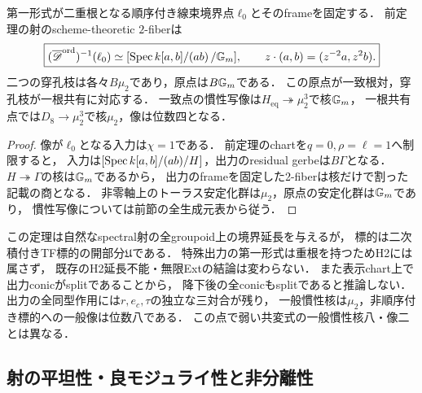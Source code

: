 \begin{corollary}[線束境界上の全fiber]
\label{cor:qa-global-fricke-boundary-fiber}
第一形式が二重根となる順序付き線束境界点$\ell_0$とそのframeを固定する．
前定理の射のscheme-theoretic $2$-fiberは
\[
 \boxed{
 (\overline{\mathscr D}^{\mathrm{ord}})^{-1}(\ell_0)
 \simeq[\operatorname{Spec} k[a,b]/(ab)\,/\mathbb G_m],
 \qquad z\cdot(a,b)=(z^{-2}a,z^2b).
 }
\]
二つの穿孔枝は各々$B\mu_2$であり，原点は$B\mathbb G_m$である．
この原点が一致根対，穿孔枝が一根共有に対応する．
一致点の慣性写像は$H_{\mathrm{eq}}\twoheadrightarrow\mu_2^3$で核$\mathbb G_m$，
一根共有点では$D_8\to\mu_2^3$で核$\mu_2$，像は位数四となる．
\end{corollary}
\begin{proof}
像が$\ell_0$となる入力は$\chi=1$である．
前定理のchartを$q=0,\rho=\ell=1$へ制限すると，
入力は$[\operatorname{Spec} k[a,b]/(ab)/H]$，出力のresidual gerbeは$B\Gamma$となる．
$H\twoheadrightarrow\Gamma$の核は$\mathbb G_m$であるから，
出力のframeを固定した2-fiberは核だけで割った記載の商となる．
非零軸上のトーラス安定化群は$\mu_2$，原点の安定化群は$\mathbb G_m$であり，
慣性写像については前節の全生成元表から従う．
\end{proof}

\begin{remark}[延長の標的とH2障害]
この定理は自然なspectral射の全groupoid上の境界延長を与えるが，
標的は二次積付きTF標的の開部分$\mathfrak U$である．
特殊出力の第一形式は重根を持つためH2には属さず，
既存のH2延長不能・無限Extの結論は変わらない．
また表示chart上で出力conicがsplitであることから，
降下後の全conicもsplitであると推論しない．
出力の全同型作用には$r,e_c,\tau$の独立な三対合が残り，
一般慣性核は$\mu_2$，非順序付き標的への一般像は位数八である．
この点で弱い共変式の一般慣性核八・像二とは異なる．
\end{remark}

\subsection{射の平坦性・良モジュライ性と非分離性}

